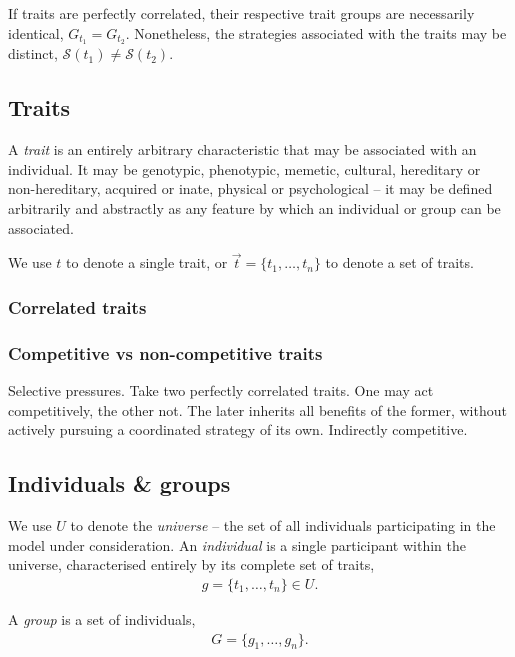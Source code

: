 \documentclass[aps,rmp,twocolumn,amsmath,amssymb,nofootinbib,superscriptaddress]{revtex4}
\begin{document}
If traits are perfectly correlated, their respective trait groups are necessarily identical, $G_{t_1}=G_{t_2}$. Nonetheless, the strategies associated with the traits may be distinct, $\mathcal{S}(t_1)\neq\mathcal{S}(t_2)$.

\subsection{Traits}

A \textit{trait} is an entirely arbitrary characteristic that may be associated with an individual. It may be genotypic, phenotypic, memetic, cultural, hereditary or non-hereditary, acquired or inate, physical or psychological -- it may be defined arbitrarily and abstractly as any feature by which an individual or group can be associated.

We use $t$ to denote a single trait, or $\vec t=\{t_1,\dots,t_n\}$ to denote a set of traits.

\subsubsection{Correlated traits}

\subsubsection{Competitive vs non-competitive traits}

Selective pressures. Take two perfectly correlated traits. One may act competitively, the other not. The later inherits all benefits of the former, without actively pursuing a coordinated strategy of its own. Indirectly competitive.

\subsection{Individuals \& groups}

We use $U$ to denote the \textit{universe} -- the set of all individuals participating in the model under consideration. An \textit{individual} is a single participant within the universe, characterised entirely by its complete set of traits,
\begin{align}
	g=\{t_1,\dots,t_n\} \in U.
\end{align}

A \textit{group} is a set of individuals,
\begin{align}
	G = \{g_1,\dots,g_n\}.	
\end{align}
\end{document}
